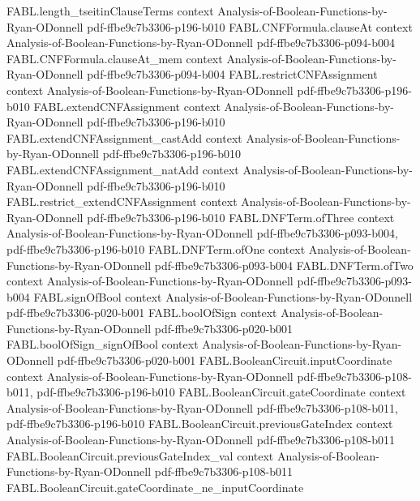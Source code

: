 \begin{theorem}
\proofstep
  {FABL.length_tseitinClauseTerms}
  {context}
  {Analysis-of-Boolean-Functions-by-Ryan-ODonnell}
  {pdf-ffbe9c7b3306-p196-b010}
\proofstep
  {FABL.CNFFormula.clauseAt}
  {context}
  {Analysis-of-Boolean-Functions-by-Ryan-ODonnell}
  {pdf-ffbe9c7b3306-p094-b004}
\proofstep
  {FABL.CNFFormula.clauseAt_mem}
  {context}
  {Analysis-of-Boolean-Functions-by-Ryan-ODonnell}
  {pdf-ffbe9c7b3306-p094-b004}
\proofstep
  {FABL.restrictCNFAssignment}
  {context}
  {Analysis-of-Boolean-Functions-by-Ryan-ODonnell}
  {pdf-ffbe9c7b3306-p196-b010}
\proofstep
  {FABL.extendCNFAssignment}
  {context}
  {Analysis-of-Boolean-Functions-by-Ryan-ODonnell}
  {pdf-ffbe9c7b3306-p196-b010}
\proofstep
  {FABL.extendCNFAssignment_castAdd}
  {context}
  {Analysis-of-Boolean-Functions-by-Ryan-ODonnell}
  {pdf-ffbe9c7b3306-p196-b010}
\proofstep
  {FABL.extendCNFAssignment_natAdd}
  {context}
  {Analysis-of-Boolean-Functions-by-Ryan-ODonnell}
  {pdf-ffbe9c7b3306-p196-b010}
\proofstep
  {FABL.restrict_extendCNFAssignment}
  {context}
  {Analysis-of-Boolean-Functions-by-Ryan-ODonnell}
  {pdf-ffbe9c7b3306-p196-b010}
\proofstep
  {FABL.DNFTerm.ofThree}
  {context}
  {Analysis-of-Boolean-Functions-by-Ryan-ODonnell}
  {pdf-ffbe9c7b3306-p093-b004,
    pdf-ffbe9c7b3306-p196-b010}
\proofstep
  {FABL.DNFTerm.ofOne}
  {context}
  {Analysis-of-Boolean-Functions-by-Ryan-ODonnell}
  {pdf-ffbe9c7b3306-p093-b004}
\proofstep
  {FABL.DNFTerm.ofTwo}
  {context}
  {Analysis-of-Boolean-Functions-by-Ryan-ODonnell}
  {pdf-ffbe9c7b3306-p093-b004}
\proofstep
  {FABL.signOfBool}
  {context}
  {Analysis-of-Boolean-Functions-by-Ryan-ODonnell}
  {pdf-ffbe9c7b3306-p020-b001}
\proofstep
  {FABL.boolOfSign}
  {context}
  {Analysis-of-Boolean-Functions-by-Ryan-ODonnell}
  {pdf-ffbe9c7b3306-p020-b001}
\proofstep
  {FABL.boolOfSign_signOfBool}
  {context}
  {Analysis-of-Boolean-Functions-by-Ryan-ODonnell}
  {pdf-ffbe9c7b3306-p020-b001}
\proofstep
  {FABL.BooleanCircuit.inputCoordinate}
  {context}
  {Analysis-of-Boolean-Functions-by-Ryan-ODonnell}
  {pdf-ffbe9c7b3306-p108-b011,
    pdf-ffbe9c7b3306-p196-b010}
\proofstep
  {FABL.BooleanCircuit.gateCoordinate}
  {context}
  {Analysis-of-Boolean-Functions-by-Ryan-ODonnell}
  {pdf-ffbe9c7b3306-p108-b011,
    pdf-ffbe9c7b3306-p196-b010}
\proofstep
  {FABL.BooleanCircuit.previousGateIndex}
  {context}
  {Analysis-of-Boolean-Functions-by-Ryan-ODonnell}
  {pdf-ffbe9c7b3306-p108-b011}
\proofstep
  {FABL.BooleanCircuit.previousGateIndex_val}
  {context}
  {Analysis-of-Boolean-Functions-by-Ryan-ODonnell}
  {pdf-ffbe9c7b3306-p108-b011}
\proofstep
  {FABL.BooleanCircuit.gateCoordinate_ne_inputCoordinate}

\end{theorem}
